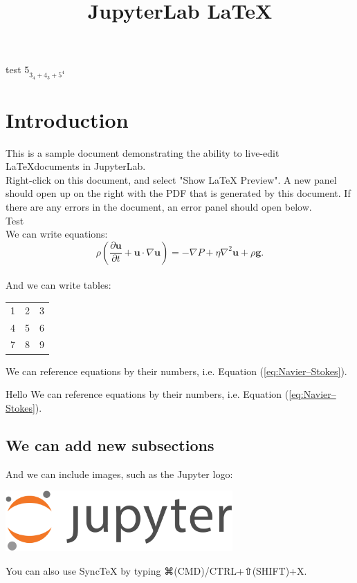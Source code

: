 \documentclass{article}
\begin{document}
\title{JupyterLab \LaTeX}
\date{}
\maketitle
test
$5_{3_{4} + 4_{3} + 5^{4}}$
\section{Introduction}
This is a sample document demonstrating the ability to live-edit
\LaTeX documents in JupyterLab.
\\
Right-click on this document, and select "Show LaTeX Preview".
A new panel should open up on the right with the PDF that is generated
by this document. If there are any errors in the document, an
error panel should open below.
\\
Test
\\
We can write equations:
\begin{equation}
    \rho \left( \frac{\partial \mathbf{u}}{\partial t} + \mathbf{u} \cdot \nabla \mathbf{u} \right) =
    -\nabla P + \eta \nabla^2 \mathbf{u} + \rho \mathbf{g}.
\label{eq:Navier–Stokes}
\end{equation}
\\
And we can write tables:
\begin{center}
  \begin{tabular}{ | l | c | r| }
    \hline
    1 & 2 & 3 \\ 
    4 & 5 & 6 \\ 
    7 & 8 & 9 \\
    \hline
  \end{tabular}
\end{center}




We can reference equations by their numbers, i.e. Equation (\ref{eq:Navier–Stokes}).

Hello
We can reference equations by their numbers, i.e. Equation (\ref{eq:Navier–Stokes}).


\subsection{We can add new subsections}
And we can include images, such as the Jupyter logo:
\begin{center}
  \includegraphics[width=0.65\textwidth]{images/jupyter_logo.png}
\end{center}



\pagebreak


You can also use SyncTeX by typing ⌘(CMD)/CTRL+⇧(SHIFT)+X.
\end{document}
